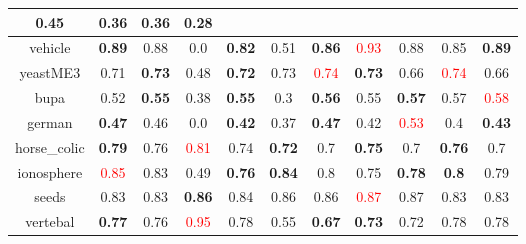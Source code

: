 \documentclass{article}%
\begin{document}
\begin{tabular}{c|cccccccccc}
{0.45
}&0.36&\textbf{0.36}&0.28\\%
\hline%
vehicle&\textbf{0.89}&0.88&0.0&\textbf{0.82}&0.51&\textbf{0.86}&\textcolor{red}{ 
0.93
}&0.88&0.85&\textbf{0.89}\\%
\hline%
yeastME3&0.71&\textbf{0.73}&0.48&\textbf{0.72}&0.73&\textcolor{red}{ 
0.74
}&\textbf{0.73}&0.66&\textcolor{red}{ 
0.74
}&0.66\\%
\hline%
bupa&0.52&\textbf{0.55}&0.38&\textbf{0.55}&0.3&\textbf{0.56}&0.55&\textbf{0.57}&0.57&\textcolor{red}{ 
0.58
}\\%
\hline%
german&\textbf{0.47}&0.46&0.0&\textbf{0.42}&0.37&\textbf{0.47}&0.42&\textcolor{red}{ 
0.53
}&0.4&\textbf{0.43}\\%
\hline%
horse\_colic&\textbf{0.79}&0.76&\textcolor{red}{ 
0.81
}&0.74&\textbf{0.72}&0.7&\textbf{0.75}&0.7&\textbf{0.76}&0.7\\%
\hline%
ionosphere&\textcolor{red}{ 
0.85
}&0.83&0.49&\textbf{0.76}&\textbf{0.84}&0.8&0.75&\textbf{0.78}&\textbf{0.8}&0.79\\%
\hline%
seeds&0.83&0.83&\textbf{0.86}&0.84&0.86&0.86&\textcolor{red}{ 
0.87
}&0.87&0.83&0.83\\%
\hline%
vertebal&\textbf{0.77}&0.76&\textcolor{red}{ 
0.95
}&0.78&0.55&\textbf{0.67}&\textbf{0.73}&0.72&0.78&0.78\\%
\hline%
\end{tabular}

%
\end{document}
